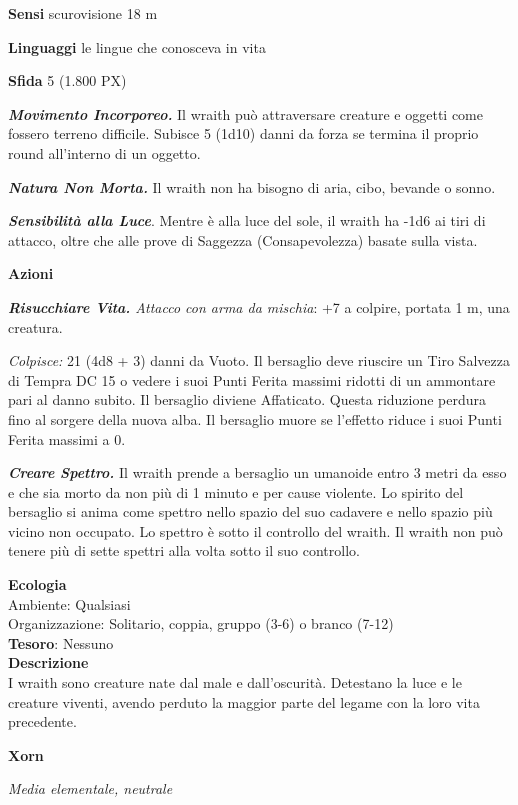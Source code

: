 \begin{multicols}{2}
\textbf{Sensi} scurovisione 18 m

\textbf{Linguaggi} le lingue che conosceva in vita

\textbf{Sfida} 5 (1.800 PX)

\textit{\textbf{Movimento Incorporeo.}} Il wraith può attraversare creature e oggetti come fossero terreno difficile. Subisce 5 (1d10) danni da forza se termina il proprio round all'interno di un oggetto.

\textit{\textbf{Natura Non Morta.}} Il wraith non ha bisogno di aria, cibo, bevande o sonno.

\textit{\textbf{Sensibilità alla Luce}}. Mentre è alla luce del sole, il wraith ha -1d6 ai tiri di attacco, oltre che alle prove di Saggezza (Consapevolezza) basate sulla vista.

\textbf{Azioni}

\textit{\textbf{Risucchiare Vita.} Attacco con arma da mischia}: +7 a colpire, portata 1 m, una creatura.

\textit{Colpisce:} 21 (4d8 + 3) danni da Vuoto. Il bersaglio deve riuscire un Tiro Salvezza di Tempra DC 15 o vedere i suoi Punti Ferita massimi ridotti di un ammontare pari al danno subito. Il bersaglio diviene Affaticato. Questa riduzione perdura fino al sorgere della nuova alba. Il bersaglio muore se l'effetto riduce i suoi Punti Ferita massimi a 0.

\textit{\textbf{Creare Spettro.}} Il wraith prende a bersaglio un umanoide entro 3 metri da esso e che sia morto da non più di 1 minuto e per cause violente. Lo spirito del bersaglio si anima come spettro nello spazio del suo cadavere e nello spazio più vicino non occupato. Lo spettro è sotto il controllo del wraith. Il wraith non può tenere più di sette spettri alla volta sotto il suo controllo.

\textbf{Ecologia}\\
Ambiente: Qualsiasi\\
Organizzazione: Solitario, coppia, gruppo (3-6) o branco (7-12)\\
\textbf{Tesoro}: Nessuno\\
\textbf{Descrizione}\\
I wraith sono creature nate dal male e dall'oscurità. Detestano la luce e le creature viventi, avendo perduto la maggior parte del legame con la loro vita precedente.


\medskip{}\textbf{Xorn}

\textit{Media elementale, neutrale}


\end{multicols}
